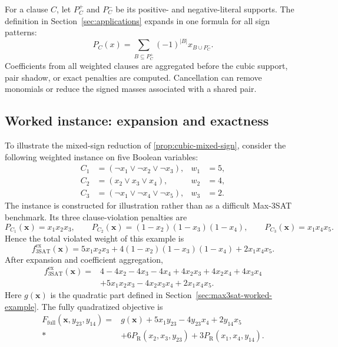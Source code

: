 \documentclass[a4paper,onecolumn,11pt,unpublished]{quantumarticle}
\newcommand{\PR}{P_{\mathrm R}}
\theoremstyle{remark}
\begin{document}
For a clause \(C\), let \(P_C^+\) and \(P_C^-\) be its positive- and
negative-literal supports.  The definition in Section~\ref{sec:applications}
expands in one formula for all sign patterns:
\[
P_C(x)=\sum_{B\subseteq P_C^+}(-1)^{|B|}x_{B\cup P_C^-}.
\]
Coefficients from all weighted clauses are aggregated before the cubic
support, pair shadow, or exact penalties are computed.  Cancellation can
remove monomials or reduce the signed masses associated with a shared pair.

\subsection{Worked instance: expansion and exactness}
\label{app:max3sat-worked}

To illustrate the mixed-sign reduction of \cref{prop:cubic-mixed-sign}, consider
the following weighted instance on five
Boolean variables:
\begin{equation}
    \begin{aligned}
        C_1&=(\neg x_1\lor\neg x_2\lor\neg x_3), & w_1&=5,\\
        C_2&=(x_2\lor x_3\lor x_4),              & w_2&=4,\\
        C_3&=(\neg x_1\lor\neg x_4\lor\neg x_5), & w_3&=2.
    \end{aligned}
    \label{eq:max3sat-worked-clauses}
\end{equation}
The instance is constructed for illustration rather than as a difficult
Max-3SAT benchmark. Its three clause-violation penalties are
\begin{equation}
    P_{C_1}(\bm x)=x_1x_2x_3,\qquad
    P_{C_2}(\bm x)=(1-x_2)(1-x_3)(1-x_4),\qquad
    P_{C_3}(\bm x)=x_1x_4x_5.
    \label{eq:max3sat-worked-clause-penalties}
\end{equation}
Hence the total violated weight of this example is
\begin{equation}
    f_{\mathrm{3SAT}}^{\mathrm{ex}}(\bm x)
    =5x_1x_2x_3
     +4(1-x_2)(1-x_3)(1-x_4)
     +2x_1x_4x_5.
    \label{eq:max3sat-worked-objective}
\end{equation}
After expansion and coefficient aggregation,
\begin{align}
    f_{\mathrm{3SAT}}^{\mathrm{ex}}(\bm x)
    ={}&4-4x_2-4x_3-4x_4
       +4x_2x_3+4x_2x_4+4x_3x_4 \nonumber\\
      &+5x_1x_2x_3-4x_2x_3x_4+2x_1x_4x_5.
    \label{eq:max3sat-worked-full-expansion}
\end{align}
Here $g(\bm x)$ is the quadratic part defined in
Section~\ref{sec:max3sat-worked-example}. The fully quadratized objective is
\begin{align}
    F_{\mathrm{full}}(\bm x,y_{23},y_{14})
    ={}&g(\bm x)+5x_1y_{23}-4y_{23}x_4+2y_{14}x_5 \nonumber\\*
      &+6\PR(x_2,x_3,y_{23})
       +3\PR(x_1,x_4,y_{14}).
    \label{eq:max3sat-worked-full}
\end{align}
\end{document}
